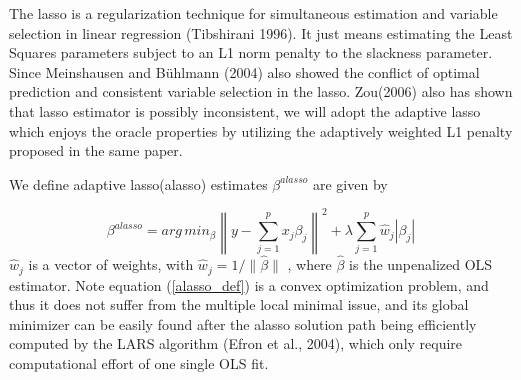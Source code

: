 \documentclass[titlepage,11pt]{article}
\begin{document}
The lasso is a regularization technique for simultaneous estimation and variable selection in linear regression (Tibshirani 1996).  It just means estimating the Least Squares parameters subject to an L1 norm penalty to the slackness parameter. Since Meinshausen and Bühlmann (2004) also showed the conflict of optimal prediction and consistent variable selection in the lasso.  Zou(2006) also has shown that lasso estimator is possibly inconsistent, we will adopt the adaptive lasso which enjoys the oracle properties
by utilizing the adaptively weighted L1 penalty proposed in the same paper.

We define adaptive lasso(alasso) estimates $\beta^{alasso}$ are given by

\begin{equation}
\label{alasso_def}
\beta^{alasso}=arg\,min_{\beta} \left\| y-\sum^p_{j=1}x_j\beta_j \right\| ^2 + \lambda\sum^p_{j=1}\hat{w}_j|\beta_j|
\end{equation}
$\hat{w}_j$  is a vector of weights, with $\hat{w}_j = 1/\|\hat{\beta}\|$ , where $\hat{\beta}$ is the unpenalized OLS estimator. Note equation (\ref{alasso_def}) is a convex optimization problem, and thus it does not suffer from the multiple  local minimal issue, and its global minimizer can be easily found after the alasso solution path being efficiently computed by the LARS algorithm (Efron et al., 2004), which only require computational effort of one single OLS fit. 
\end{document}
